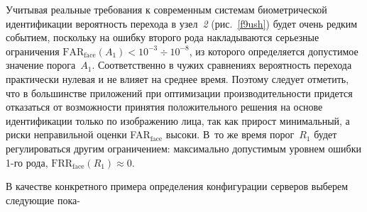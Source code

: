 \begin{multicols}{2}
     Учитывая реальные требования к современным системам биометрической 
идентификации  вероятность перехода в узел~\textit{2} (рис.~\ref{f9ush}) будет очень 
редким событием, поскольку на ошибку второго рода накладываются серьезные 
ограничения $\mathrm{FAR}_{\mathrm{face}}(A_1)<10^{-3}\div 10^{-8}$, из которого 
определяется допустимое значение порога~$A_1$. Соответственно в чужих сравнениях 
вероятность перехода прак\-тиче\-ски нулевая и не влияет на среднее \mbox{время}. Поэто\-му 
следует отметить, что в боль\-шинст\-ве приложений при оптимизации 
про\-из\-во\-ди\-тель\-ности %
придет\-ся отказаться от возможности принятия положительного 
решения на основе идентификации только по изображению лица, так как прирост 
минимальный, а риски неправильной оценки FAR$_{\mathrm{face}}$ высоки. 
В~то же время порог~$R_1$ будет регулироваться другим ограничением: максимально 
допустимым уровнем ошибки 1-го рода, $\mathrm{FRR}_{\mathrm{face}} (R_1)\approx 
0$. 
{%

}

В качестве конкретного примера определения конфигурации серверов выберем 
следующие пока-

\end{multicols}

